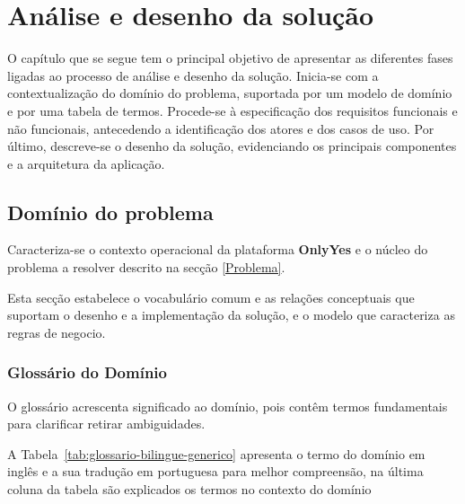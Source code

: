 % 
\chapter{Análise e desenho da solução} %
\label{chap:ADS} %

O capítulo que se segue tem o principal objetivo de apresentar as diferentes fases ligadas ao processo de análise e desenho da solução. Inicia-se com a contextualização do domínio do problema, suportada por um modelo de domínio e por uma tabela de termos. Procede-se à especificação dos requisitos funcionais e não funcionais, antecedendo a identificação dos atores e dos casos de uso. Por último, descreve-se o desenho da solução, evidenciando os principais componentes e a arquitetura da aplicação.



\section{Domínio do problema} 
\label{sec:DP} 

Caracteriza-se o contexto operacional da plataforma \textbf{OnlyYes} e o núcleo do problema a resolver descrito na secção \ref{Problema}.

Esta secção estabelece o vocabulário comum e as relações conceptuais que suportam o desenho e a implementação da solução, e o modelo que caracteriza as regras de negocio.

\subsection{Glossário do Domínio}

O glossário acrescenta significado ao domínio, pois contêm termos fundamentais para clarificar retirar ambiguidades.

A Tabela~\ref{tab:glossario-bilingue-generico} apresenta o termo do domínio em inglês e a sua tradução em portuguesa para melhor compreensão, na última coluna da tabela são explicados os termos no contexto do domínio

